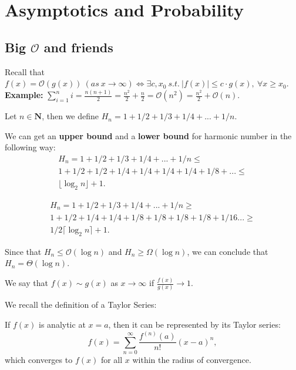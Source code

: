 \section{Asymptotics and Probability}


\subsection{Big $\mathcal{O}$ and friends}

Recall that $f(x) = \mathcal{O}(g(x)) ~(as~x\rightarrow\infty) \iff \exists c,x_0~s.t.~ |f(x)| \leq c\cdot g(x), ~\forall x \geq x_0.$ \textbf{Example:} $\sum_{i=1}^{n} i = \frac{n(n+1)}{2} = \frac{n^2}{2} + \frac{n}{2} = \mathcal{O}(n^2) = \frac{n^2}{2} + \mathcal{O}(n) $.


\begin{definition}
    Let $n \in \mathbf{N}$, then we define $H_n=1+1/2 +1/3+1/4 + ...+1/n.$
\end{definition}

We can get an \textbf{upper bound} and a \textbf{lower bound} for harmonic number in the following way:
\begin{align*}
    H_n=1+1/2 +1/3+1/4 + ...+1/n \leq \\    
    1 + 1/2 + 1/2 + 1/4 + 1/4 + 1/4 + 1/4 + 1/8 + ... \leq\\
    \lfloor \log_2 n \rfloor + 1.
\end{align*}

\begin{align*}
    H_n=1+1/2 +1/3+1/4 + ...+1/n \geq \\    
    1 + 1/2 + 1/4 + 1/4 + 1/8 + 1/8 + 1/8 + 1/8 + 1/16 ... \geq\\
    1/2 \lceil \log_2 n \rceil + 1.
\end{align*}

Since that $H_n \leq \mathcal{O}(\log n)$ and $H_n \geq \Omega(\log n)$, we can conclude that $H_n = \Theta(\log n).$

\begin{definition}[$f(x) \sim g(x)$]
    We say that $f(x) \sim g(x)$ as $x \rightarrow \infty$ if $\frac{f(x)}{g(x)} \rightarrow 1$.
\end{definition}

We recall the definition of a Taylor Series:

\begin{theorem}
If $f(x)$ is analytic at $x=a$, then it can be represented by its Taylor series:
\[
f(x)=\sum_{n=0}^{\infty}\frac{f^{(n)}(a)}{n!}(x-a)^n,
\]
which converges to $f(x)$ for all $x$ within the radius of convergence.
\end{theorem}

